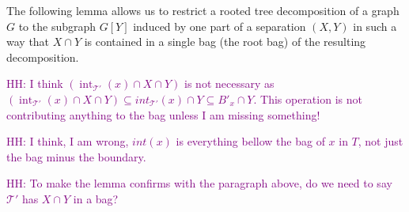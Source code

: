 \documentclass{patmorin}
\DeclareMathOperator{\interior}{int}
\DeclareMathOperator{\boundary}{\partial}
\newcommand{\hussein}[1]{\textcolor{purple}{HH: #1}}
\begin{document}


The following lemma allows us to restrict a rooted tree decomposition of a graph $G$ to the subgraph $G[Y]$ induced by one part of a separation $(X,Y)$ in such a way that $X\cap Y$ is contained in a single bag (the root bag) of the resulting decomposition.

\hussein{I think $(\interior_{\mathcal{T}'}(x) \cap X \cap Y)$ is not necessary as $(\interior_{\mathcal{T}'}(x) \cap X \cap Y) \subseteq int_{\mathcal{T}'}(x) \cap Y \subseteq B'_x \cap Y$. This operation is not contributing anything to the bag unless I am missing something!}

\hussein{I think, I am wrong, $int(x)$ is everything bellow the bag of $x$ in $T$, not just the bag minus the boundary.}

\hussein{To make the lemma confirms with the paragraph above, do we need to say $\mathcal{T}'$ has $X\cap Y$ in a bag?}
\end{document}
